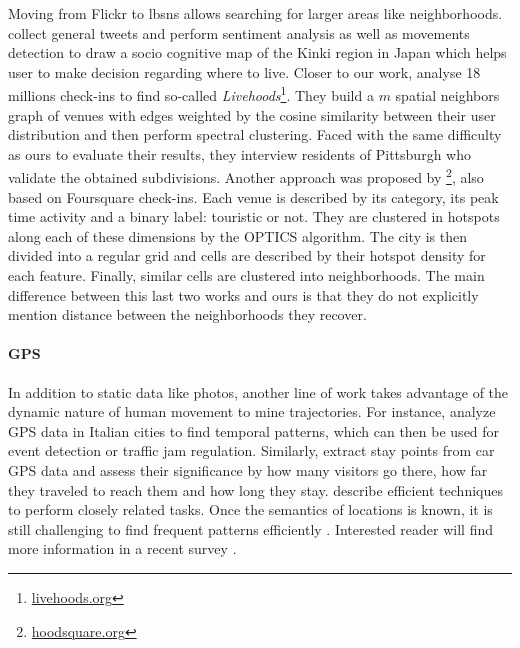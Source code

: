 Moving from Flickr to \glspl{lbsn} allows searching for larger areas like
neighborhoods. \Textcite{SocioMap12} collect general tweets and perform
sentiment analysis as well as movements detection to draw a socio cognitive map
of the Kinki region in Japan which helps user to make decision regarding where
to live. Closer to our work, \textcite{Livehoods12} analyse 18 millions
check-ins to find so-called
\emph{Livehoods}\footnote{\href{http://livehoods.org/}{\url{livehoods.org}}}.
They build a $m$ spatial neighbors graph of venues with edges weighted by the
cosine similarity between their user distribution and then perform spectral
clustering. Faced with the same difficulty as ours to evaluate their results,
they interview residents of Pittsburgh who validate the obtained subdivisions.
Another approach was proposed by
\textcite{Hoodsquare13}\footnote{\href{http://pizza.cl.cam.ac.uk/hoodsquare/}%
{\url{hoodsquare.org}}}, also based on Foursquare check-ins. Each venue is
described by its category, its peak time activity and a binary label:
touristic or not. They are clustered in hotspots along each of these dimensions
by the \textsc{OPTICS} algorithm. The city is then divided into a regular grid
and cells are described by their hotspot density for each feature.
Finally, similar cells
are clustered into neighborhoods. The main difference between this last two
works and ours is that they do not explicitly mention distance between the
neighborhoods they recover.

\paragraph{GPS}

In addition to static data like photos, another line of work takes advantage
of the dynamic nature of human movement to mine trajectories. For instance,
\textcite{MAtlas11} analyze GPS data in Italian cities to find temporal
patterns, which can then be used for event detection or traffic jam
regulation. Similarly, \textcite{GPSStay10} extract stay points from car GPS
data and assess their significance by how many visitors go there, how far they
traveled to reach them and how long they stay. \Textcite{TrajROI11} describe
efficient techniques to perform closely related tasks. Once the semantics of
locations is known, it is still challenging to find frequent patterns
efficiently \autocite{SemanticTrajectories14}. Interested reader will find
more information in a recent survey \autocite{TrajSurvey13}.


